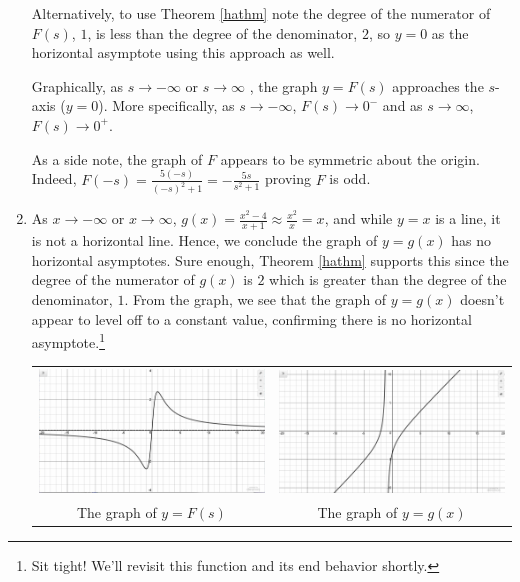 \documentclass{ximera}
\begin{document}
\begin{ex}
\begin{enumerate}
Alternatively, to use Theorem \ref{hathm} note the degree of the numerator of  $F(s)$,  $1$, is less than the degree of the denominator, $2$,  so  $y=0$ as the horizontal asymptote using this approach as well.

Graphically, as $s \rightarrow  -\infty$ or $s \rightarrow  \infty$ , the graph $y = F(s)$ approaches the $s$-axis ($y = 0$).  More specifically, as $s \rightarrow -\infty$, $F(s)  \rightarrow 0^{-}$ and as $s \rightarrow \infty$, $F(s)  \rightarrow 0^{+}$.  

As a side note, the graph of $F$ appears to be symmetric about the origin.  Indeed, $F(-s) = \frac{5(-s)}{(-s)^2+1} = -\frac{5s}{s^2+1}$ proving $F$ is odd.

\item  As $x \rightarrow  -\infty$ or $x \rightarrow \infty$, $g(x) = \frac{x^2-4}{x+1} \approx \frac{x^2}{x} = x$, and while $y = x$ is a line, it is not a horizontal line.  Hence, we conclude the graph of $y = g(x)$ has no horizontal asymptotes.  Sure enough,  Theorem \ref{hathm} supports this since the degree of the numerator of $g(x)$ is $2$ which is greater than the degree of the denominator, $1$.   From the graph, we see that the graph of $y=g(x)$ doesn't appear to level off to a constant value, confirming there is no horizontal asymptote.\footnote{Sit tight!  We'll revisit this function and its end behavior shortly.}

\begin{center}
\begin{tabular}{cc}

\includegraphics[width=3in]{./IntroRationalGraphics/HAEx01.jpg}  & \includegraphics[width=3in]{./IntroRationalGraphics/HAEx02.jpg} \\
The graph of $y=F(s)$  & The graph of $y=g(x)$ \\



\end{tabular}
\end{center}
\end{enumerate}
\end{ex}
\end{document}
